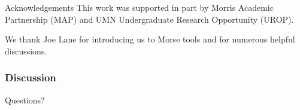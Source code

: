 \documentclass{beamer}
\begin{document}
\begin{frame}{Acknowledgements}
This work was supported in part by Morris Academic Partnership (MAP) and UMN Undergraduate Research Opportunity (UROP).  \\ 

\vspace*{0.2in}

We thank Joe Lane for introducing us to Morse tools and for numerous helpful discussions.
\end{frame}

\begin{frame}
  \frametitle{Discussion}
Questions?
\end{frame}
\end{document}
